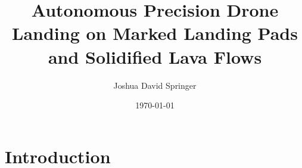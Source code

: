 \documentclass[10pt,twoside,b5paper]{book}
\author{Joshua David Springer}
\title{Autonomous Precision Drone Landing on Marked Landing Pads and Solidified Lava Flows}
\date{\specialdate\today}
\begin{document}
	
	

	
	

	\section{Introduction}
	

	
	
\end{document}
